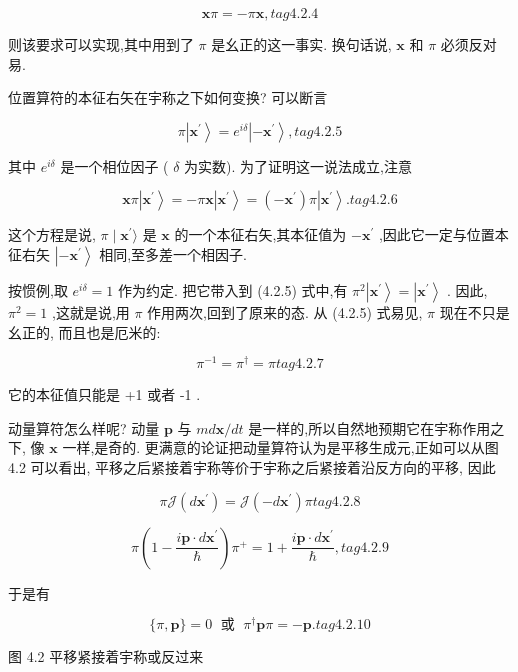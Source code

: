 $$
\mathbf{x}\pi = - \pi \mathbf{x}, tag{4.2.4}
$$

则该要求可以实现,其中用到了 $\pi$ 是幺正的这一事实. 换句话说, $\mathbf{x}$ 和 $\pi$ 必须反对易.

位置算符的本征右矢在宇称之下如何变换? 可以断言

$$
\pi \left| {\mathbf{x}}^{\prime }\right\rangle = {e}^{i\delta }\left| {-{\mathbf{x}}^{\prime }}\right\rangle , tag{4.2.5}
$$

其中 ${e}^{i\delta }$ 是一个相位因子 ( $\delta$ 为实数). 为了证明这一说法成立,注意

$$
\mathbf{x}\pi \left| {\mathbf{x}}^{\prime }\right\rangle = - \pi \mathbf{x}\left| {\mathbf{x}}^{\prime }\right\rangle = \left( {-{\mathbf{x}}^{\prime }}\right) \pi \left| {\mathbf{x}}^{\prime }\right\rangle . tag{4.2.6}
$$

这个方程是说, $\pi \mid {\mathbf{x}}^{\prime }\rangle$ 是 $\mathbf{x}$ 的一个本征右矢,其本征值为 $- {\mathbf{x}}^{\prime }$ ,因此它一定与位置本征右矢 $\left| {-{\mathbf{x}}^{\prime }}\right\rangle$ 相同,至多差一个相因子.

按惯例,取 ${e}^{i\delta } = 1$ 作为约定. 把它带入到 (4.2.5) 式中,有 ${\pi }^{2}\left| {\mathbf{x}}^{\prime }\right\rangle = \left| {\mathbf{x}}^{\prime }\right\rangle$ . 因此, ${\pi }^{2} = 1$ ,这就是说,用 $\pi$ 作用两次,回到了原来的态. 从 (4.2.5) 式易见, $\pi$ 现在不只是幺正的, 而且也是厄米的:

$$
{\pi }^{-1} = {\pi }^{ \dagger } = \pi tag{4.2.7}
$$

它的本征值只能是 +1 或者 -1 .

动量算符怎么样呢? 动量 $\mathbf{p}$ 与 ${md}\mathbf{x}/{dt}$ 是一样的,所以自然地预期它在宇称作用之下, 像 $\mathbf{x}$ 一样,是奇的. 更满意的论证把动量算符认为是平移生成元,正如可以从图 4.2 可以看出, 平移之后紧接着宇称等价于宇称之后紧接着沿反方向的平移, 因此

$$
\pi \mathcal{J}\left( {d{\mathbf{x}}^{\prime }}\right) = \mathcal{J}\left( {-d{\mathbf{x}}^{\prime }}\right) \pi tag{4.2.8}
$$

$$
\pi \left( {1 - \frac{i\mathbf{p} \cdot d{\mathbf{x}}^{\prime }}{\hslash }}\right) {\pi }^{ + } = 1 + \frac{i\mathbf{p} \cdot d{\mathbf{x}}^{\prime }}{\hslash }, tag{4.2.9}
$$

于是有

$$
\{ \pi ,\mathbf{p}\} = 0\;\text{ 或 }\;{\pi }^{ \dagger }\mathbf{p}\pi = - \mathbf{p}. tag{4.2.10}
$$



图 4.2 平移紧接着宇称或反过来

